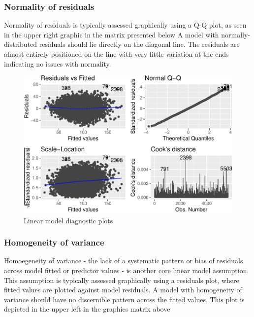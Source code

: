 \documentclass{article}
\begin{document}
\hypertarget{normality-of-residuals}{%
\subsubsection{Normality of residuals}\label{normality-of-residuals}}

Normality of residuals is typically assessed graphically using a Q-Q
plot, as seen in the upper right graphic in the matrix presented below A
model with normally-distributed residuals should lie directly on the
diagonal line. The residuals are almost entirely positioned on the line
with very little variation at the ends indicating no issues with
normality.

\begin{figure}
\centering
\includegraphics{OLET5608_TrentHenderson_files/figure-latex/unnamed-chunk-5-1.pdf}
\caption{Linear model diagnostic plots}
\end{figure}

\hypertarget{homogeneity-of-variance}{%
\subsubsection{Homogeneity of variance}\label{homogeneity-of-variance}}

Homoegeneity of variance - the lack of a systematic pattern or bias of
residuals across model fitted or predictor values - is another core
linear model assumption. This assumption is typically assessed
graphically using a residuals plot, where fitted values are plotted
against model residuals. A model with homogeneity of variance should
have no discernible pattern across the fitted values. This plot is
depicted in the upper left in the graphics matrix above
\end{document}
